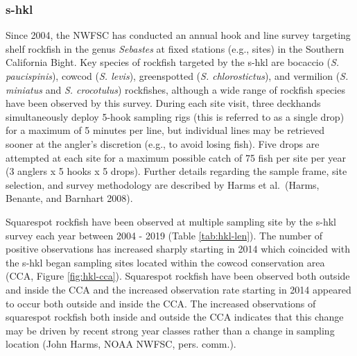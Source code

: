 \documentclass[11pt,
  english,
  a4paper,
]{article}
\begin{document}

\hypertarget{section}{%
\subsubsection{\texorpdfstring{\acrlong{s-hkl}}{}}\label{section}}

\leavevmode\tagmcend\tagstructend


Since 2004, the NWFSC has conducted an annual hook and line survey targeting shelf rockfish in the genus \emph{Sebastes} at fixed stations (e.g., sites) in the Southern California Bight. Key species of rockfish targeted by the \Gls{s-hkl} are bocaccio (\emph{S. paucispinis}), cowcod (\emph{S. levis}), greenspotted (\emph{S. chlorostictus}), and vermilion (\emph{S. miniatus} and \emph{S. crocotulus}) rockfishes, although a wide range of rockfish species have been observed by this survey. During each site visit, three deckhands simultaneously deploy 5-hook sampling rigs (this is referred to as a single drop) for a maximum of 5 minutes per line, but individual lines may be retrieved sooner at the angler's discretion (e.g., to avoid losing fish). Five drops are attempted at each site for a maximum possible catch of 75 fish per site per year (3 anglers x 5 hooks x 5 drops). Further details regarding the sample frame, site selection, and survey methodology are described by Harms et al.~{(Harms, Benante, and Barnhart 2008)\leavevmode\tagmcend\tagstructend}.

\leavevmode\tagmcend\tagstructend\par


Squarespot rockfish have been observed at multiple sampling site by the \Gls{s-hkl} survey each year between 2004 - 2019 (Table \ref{tab:hkl-len}). The number of positive observations has increased sharply starting in 2014 which coincided with the \Gls{s-hkl} began sampling sites located within the cowcod conservation area (CCA, Figure \ref{fig:hkl-cca}). Squarespot rockfish have been observed both outside and inside the CCA and the increased observation rate starting in 2014 appeared to occur both outside and inside the CCA. The increased observations of squarespot rockfish both inside and outside the CCA indicates that this change may be driven by recent strong year classes rather than a change in sampling location (John Harms, NOAA NWFSC, pers. comm.).
\end{document}
